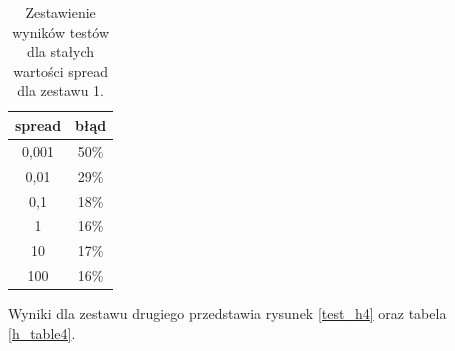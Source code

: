 \documentclass[10pt,a4paper]{article}
\begin{document}
\begin{table}[H]
\centering
\begin{tabular}{|c|c|}
\hline
spread & błąd \\
\hline
0,001 & 50\%  \\
\hline
0,01 & 29\%  \\
\hline
0,1 & 18\%  \\
\hline
1 & 16\%  \\
\hline
10 & 17\%  \\
\hline
100 & 16\%  \\
\hline
\end{tabular}
\caption{Zestawienie wyników testów dla stałych wartości spread dla zestawu 1.}
\label{h_table3}
\end{table}

Wyniki dla zestawu drugiego przedstawia rysunek \ref{test_h4} oraz tabela \ref{h_table4}.
\end{document}
